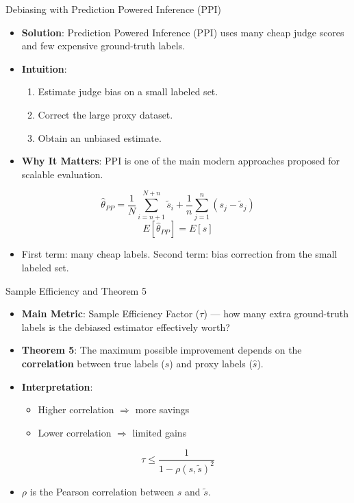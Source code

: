 \documentclass[10pt]{beamer}
\begin{document}
\begin{frame}{Debiasing with Prediction Powered Inference (PPI)}
  \begin{itemize}
    \item \textbf{Solution}: Prediction Powered Inference (PPI) uses many cheap judge scores and few expensive ground-truth labels.
    \item \textbf{Intuition}:
      \begin{enumerate}
        \item Estimate judge bias on a small labeled set.
        \item Correct the large proxy dataset.
        \item Obtain an unbiased estimate.
      \end{enumerate}
    \item \textbf{Why It Matters}: PPI is one of the main modern approaches proposed for scalable evaluation.
  \end{itemize}
  
  \vspace{0.4em}
  \[
    \hat{\theta}_{PP}
    =
    \frac{1}{N}\sum_{i=n+1}^{N+n}\tilde{s}_i
    +
    \frac{1}{n}\sum_{j=1}^{n}
    (s_j-\tilde{s}_j)
  \]
  \[
    E[\hat{\theta}_{PP}] = E[s]
  \]
  \begin{itemize}
    \item First term: many cheap labels. Second term: bias correction from the small labeled set.
  \end{itemize}
\end{frame}

\begin{frame}{Sample Efficiency and Theorem 5}
  \begin{itemize}
    \item \textbf{Main Metric}: Sample Efficiency Factor ($\tau$) --- how many extra ground-truth labels is the debiased estimator effectively worth?
    \item \textbf{Theorem 5}: The maximum possible improvement depends on the \textbf{correlation} between true labels ($s$) and proxy labels ($\hat{s}$).
    \item \textbf{Interpretation}:
      \begin{itemize}
        \item Higher correlation $\Rightarrow$ more savings
        \item Lower correlation $\Rightarrow$ limited gains
      \end{itemize}
  \end{itemize}
  
  \vspace{0.4em}
  \[
    \tau \le \frac{1}{1-\rho(s,\tilde{s})^2}
  \]
  \begin{itemize}
    \item $\rho$ is the Pearson correlation between $s$ and $\tilde{s}$.
  \end{itemize}
\end{frame}
\end{document}
